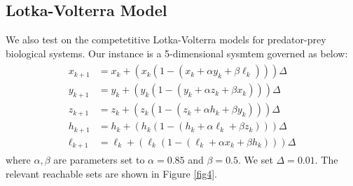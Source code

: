 \documentclass[EPiC]{easychair}
\begin{document}
\subsection{Lotka-Volterra Model}
\noindent We also test on the competetitive Lotka-Volterra models for predator-prey biological systems. Our instance is a 5-dimensional sysmtem governed as below:
\begin{align}
    \begin{split}
        x_{k+1} &= x_k + (x_k(1 - (x_k + \alpha y_k + \beta \ell_k))) \Delta \\
        y_{k+1} &= y_k + (y_k(1 - (y_k + \alpha z_k + \beta x_k))) \Delta \\
        z_{k+1} &= z_k + (z_k(1 - (z_k + \alpha h_k + \beta y_k))) \Delta \\
        h_{k+1} &= h_k + (h_k(1 - (h_k + \alpha \ell_k + \beta z_k))) \Delta \\
        \ell_{k+1} &= \ell_k + (\ell_k(1 - (\ell_k + \alpha x_k + \beta h_k))) \Delta
    \end{split}
\end{align}
where $\alpha,\beta$ are parameters set to $\alpha=0.85$ and $\beta=0.5$. We set $\Delta = 0.01$.
The relevant reachable sets are shown in Figure \ref{fig4}.
\end{document}
